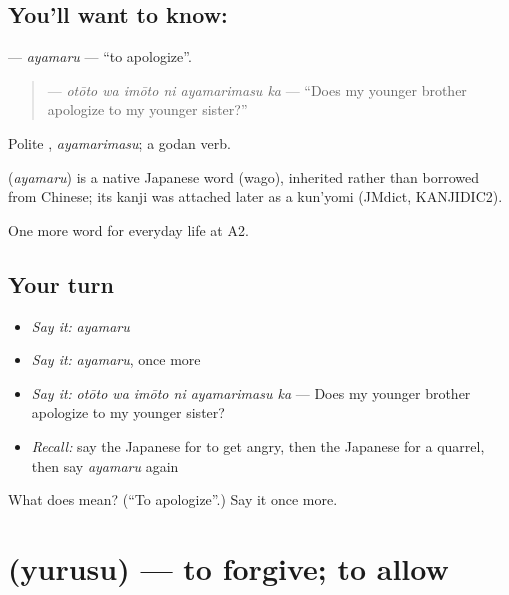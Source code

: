 \subsection*{You'll want to know: }
\textbf{} — \emph{ayamaru} — \textquotedblleft{}to apologize\textquotedblright{}.

\begin{quote}
\textbf{  } — \emph{otōto wa imōto ni ayamarimasu ka} — \textquotedblleft{}Does my younger brother apologize to my younger sister?\textquotedblright{}
\end{quote}

Polite \textbf{}, \emph{ayamarimasu}; a godan verb.

\begin{cousinweb}
\textbf{} (\emph{ayamaru}) is a native Japanese word (wago), inherited rather than borrowed from Chinese; its kanji was attached later as a kun'yomi (JMdict, KANJIDIC2).
\end{cousinweb}

\begin{grammarlens}[title={What you've built}]
One more word for everyday life at A2.
\end{grammarlens}

\subsection*{Your turn}
\begin{itemize}
\raggedright
  \item \emph{Say it:} \emph{ayamaru}
  \item \emph{Say it:} \emph{ayamaru}, once more
  \item \emph{Say it:} \emph{otōto wa imōto ni ayamarimasu ka} — Does my younger brother apologize to my younger sister?
  \item \emph{Recall:} say the Japanese for to get angry, then the Japanese for a quarrel, then say \emph{ayamaru} again
\end{itemize}

\begin{tcolorbox}[breakable,colback=teal!4,colframe=teal!35!black,title={Before you move on}]
What does  mean? (\textquotedblleft{}To apologize\textquotedblright{}.) Say it once more.
\end{tcolorbox}
\section[\texorpdfstring{\ja{ゆるす} (yurusu)}{ゆるす (yurusu)}]{ (yurusu) — to forgive; to allow}

